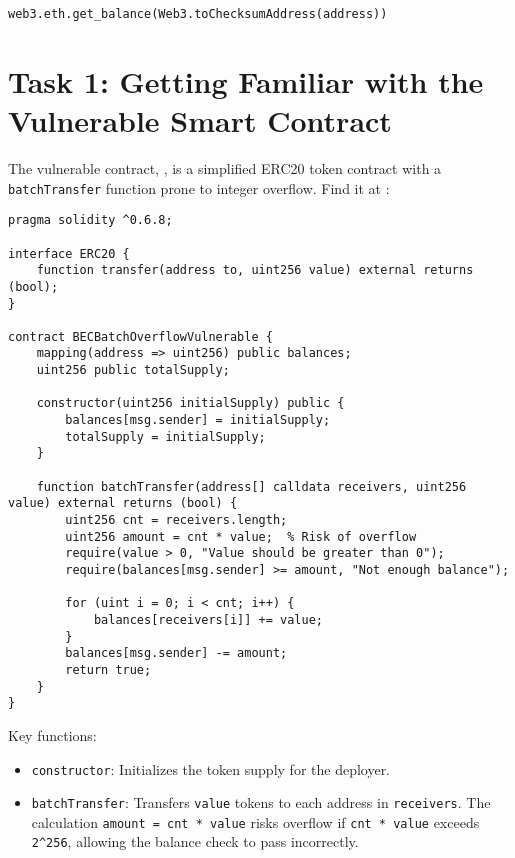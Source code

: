 \begin{lstlisting}
web3.eth.get_balance(Web3.toChecksumAddress(address))
\end{lstlisting}

\section{Task 1: Getting Familiar with the Vulnerable Smart Contract}

The vulnerable contract, , is a simplified ERC20 token contract with a \texttt{batchTransfer} function prone to integer overflow. Find it at :

\begin{lstlisting}[language=Solidity, caption = The vulnerable contract (\texttt{BatchOverFlow.sol})]
    % SPDX-License-Identifier: MIT
pragma solidity ^0.6.8;

interface ERC20 {
    function transfer(address to, uint256 value) external returns (bool);
}

contract BECBatchOverflowVulnerable {
    mapping(address => uint256) public balances;
    uint256 public totalSupply;

    constructor(uint256 initialSupply) public {
        balances[msg.sender] = initialSupply;
        totalSupply = initialSupply;
    }

    function batchTransfer(address[] calldata receivers, uint256 value) external returns (bool) {
        uint256 cnt = receivers.length;
        uint256 amount = cnt * value;  % Risk of overflow
        require(value > 0, "Value should be greater than 0");
        require(balances[msg.sender] >= amount, "Not enough balance");

        for (uint i = 0; i < cnt; i++) {
            balances[receivers[i]] += value;
        }
        balances[msg.sender] -= amount;
        return true;
    }
}
\end{lstlisting}

Key functions:
\begin{itemize}
    \item \texttt{constructor}: Initializes the token supply for the deployer.
    \item \texttt{batchTransfer}: Transfers \texttt{value} tokens to each address in \texttt{receivers}. The calculation \texttt{amount = cnt * value} risks overflow if \texttt{cnt * value} exceeds \texttt{2\^{}256}, allowing the balance check to pass incorrectly.
\end{itemize}

